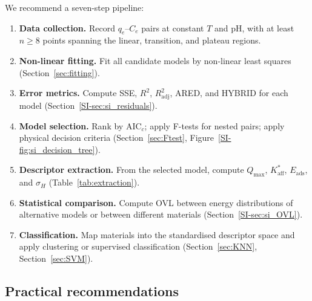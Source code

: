 \documentclass[journal=jacsat,manuscript=article]{achemso}
\begin{document}
	We recommend a seven-step pipeline:
	\begin{enumerate}
		\item \textbf{Data collection.} Record $q_e$--$C_e$ pairs at constant $T$ and pH, with at least $n \geq 8$ points spanning the linear, transition, and plateau regions.
		\item \textbf{Non-linear fitting.} Fit all candidate models by non-linear least squares (Section~\ref{sec:fitting}).
		\item \textbf{Error metrics.} Compute SSE, $R^2$, $R^2_{\mathrm{adj}}$, ARED, and HYBRID for each model (Section~\ref{SI-sec:si_residuals}).
		\item \textbf{Model selection.} Rank by AIC$_c$; apply F-tests for nested pairs; apply physical decision criteria (Section~\ref{sec:Ftest}, Figure~\ref{SI-fig:si_decision_tree}).
		\item \textbf{Descriptor extraction.} From the selected model, compute $Q_{\max}$, $K_{\mathrm{aff}}^{\ast}$, $E_{\mathrm{ads}}$, and $\sigma_H$ (Table~\ref{tab:extraction}).
		\item \textbf{Statistical comparison.} Compute OVL between energy distributions of alternative models or between different materials (Section~\ref{SI-sec:si_OVL}).
		\item \textbf{Classification.} Map materials into the standardised descriptor space and apply clustering or supervised classification (Section~\ref{sec:KNN}, Section~\ref{sec:SVM}).
	\end{enumerate}

	\subsection{Practical recommendations}
	\label{sec:practical}
\end{document}
